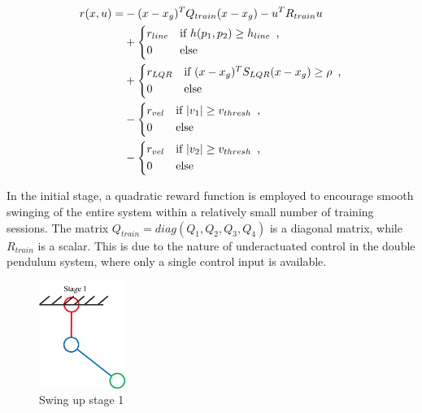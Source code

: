 \begin{equation}
\begin{aligned}
 r(x,u) = &-(x - x_g)^T Q_{train} (x - x_g) - u^T R_{train}u \\
           & +
            \begin{dcases*}
              r_{line} & \text{if} $h(p_1, p_2) \geq h_{line}$\, ,\\
              0 & \text{else}
            \end{dcases*}\\
           & +
            \begin{dcases*}
              r_{LQR} & \text{if} $(x - x_g)^T S_{LQR} (x - x_g) \geq \rho $\, ,\\
              0 & \text{else}
            \end{dcases*}\\
           & -
            \begin{dcases*}
              r_{vel} & \text{if} $|v_1| \geq v_{thresh}$\, ,\\
              0 & \text{else}
            \end{dcases*}\\
           & -
            \begin{dcases*}
              r_{vel} & \text{if} $|v_2| \geq v_{thresh}$\, ,\\
              0 & \text{else}
            \end{dcases*}
\end{aligned}
\end{equation}

In the initial stage, a quadratic reward function is employed to encourage
smooth swinging of the entire system within a relatively small number of
training sessions. The matrix  \(Q_{train} = diag(Q_1, Q_2, Q_3, Q_4)\) is a
diagonal matrix, while \(R_{train}\) is a scalar. This is due to the nature
of underactuated control in the double pendulum system, where only a single
control input is available.

\begin{figure}[H]
    \centering
    \includegraphics[width=0.25\textwidth]{figures/methodology/stage1.png} %
    \caption{Swing up stage 1}
    \label{fig:stage1} %
\end{figure}

